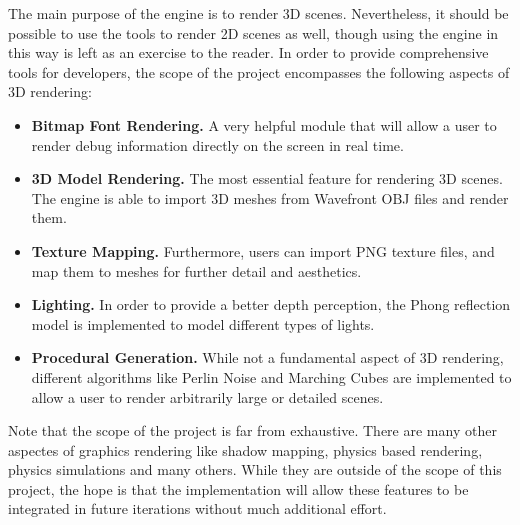 The main purpose of the engine is to render 3D scenes.
Nevertheless, it should be possible to use the tools to render 2D scenes as well,
though using the engine in this way is left as an exercise to the reader.
In order to provide comprehensive tools for developers,
the scope of the project encompasses the following aspects of 3D rendering:

\begin{itemize}
  \item \textbf{Bitmap Font Rendering.} A very helpful module that will allow a user to render debug information directly on the screen in real time.
  \item \textbf{3D Model Rendering.} The most essential feature for rendering 3D scenes. The engine is able to import 3D meshes from Wavefront OBJ files and render them.
  \item \textbf{Texture Mapping.} Furthermore, users can import PNG texture files, and map them to meshes for further detail and aesthetics.
  \item \textbf{Lighting.} In order to provide a better depth perception, the Phong reflection model is implemented to model different types of lights.
  \item \textbf{Procedural Generation.} While not a fundamental aspect of 3D rendering, different algorithms like Perlin Noise and Marching Cubes are implemented to allow a user to render arbitrarily large or detailed scenes.
\end{itemize}

Note that the scope of the project is far from exhaustive.
There are many other aspectes of graphics rendering like shadow mapping, physics based rendering, physics simulations and many others\cite{learnopengl}.
While they are outside of the scope of this project,
the hope is that the implementation will allow these features to be integrated in future iterations without much additional effort.
